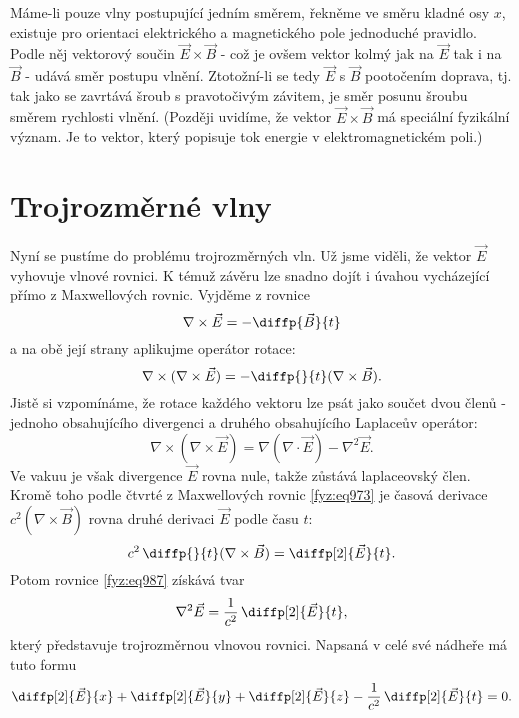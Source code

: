     Máme-li pouze vlny postupující jedním směrem, řekněme ve směru kladné osy \(x\), existuje pro
    orientaci elektrického a magnetického pole jednoduché pravidlo. Podle něj vektorový součin
    \(\vec{E} \times \vec{B}\) - což je ovšem vektor kolmý jak na \(\vec{E}\) tak i na \(\vec{B}\) -
    udává směr postupu vlnění. Ztotožní-li se tedy \(\vec{E}\) s \(\vec{B}\) pootočením doprava, tj.
    tak jako se zavrtává šroub s pravotočivým závitem, je směr posunu šroubu směrem rychlosti
    vlnění. (Později uvidíme, že vektor \(\vec{E} \times \vec{B}\) má speciální fyzikální význam. Je
    to vektor, který popisuje tok energie v elektromagnetickém poli.)

  \section{Trojrozměrné vlny}\label{fyz:IIchapXXsecII}    
    Nyní se pustíme do problému trojrozměrných vln. Už jsme viděli, že vektor \(\vec{E}\) vyhovuje
    vlnové rovnici. K témuž závěru lze snadno dojít i úvahou vycházející přímo z Maxwellových
    rovnic. Vyjděme z rovnice
    \begin{equation*}
      \nabla\times\vec{E}=-\diffp{\vec{B}}{t}
    \end{equation*}
    a na obě její strany aplikujme operátor rotace:
    \begin{equation}\label{fyz:eq987}
      \nabla\times(\nabla\times\vec{E}) = -\diffp{}{t}(\nabla\times\vec{B}).
    \end{equation}
    Jistě si vzpomínáme, že rotace každého vektoru lze psát jako součet dvou členů - jednoho
    obsahujícího divergenci a druhého obsahujícího Laplaceův operátor:
    \begin{equation*}
      \nabla\times(\nabla\times\vec{E})= \nabla(\nabla\cdot\vec{E})-\nabla^2\vec{E}.
    \end{equation*}
    Ve vakuu je však divergence \(\vec{E}\) rovna nule, takže zůstává laplaceovský člen. Kromě toho
    podle čtvrté z Maxwellových rovnic \eqref{fyz:eq973} je časová derivace \(c^2(\nabla \times
    \vec{B})\) rovna druhé derivaci \(\vec{E}\) podle času \(t\):
    \begin{equation*}
      c^2\,\diffp{}{t}(\nabla\times\vec{B})=\diffp[2]{\vec{E}}{t}.
    \end{equation*}
    Potom rovnice \eqref{fyz:eq987} získává tvar
    \begin{equation*}
      \nabla^2\vec{E} = \dfrac{1}{c^2}\,\diffp[2]{\vec{E}}{t},
    \end{equation*}
    který představuje trojrozměrnou vlnovou rovnici. Napsaná v celé své nádheře má tuto formu
    \begin{equation}\label{fyz:eq988}
      \diffp[2]{\vec{E}}{x}+\diffp[2]{\vec{E}}{y}+\diffp[2]{\vec{E}}{z}-
      \frac{1}{c^2}\,\diffp[2]{\vec{E}}{t}=0.
    \end{equation}

